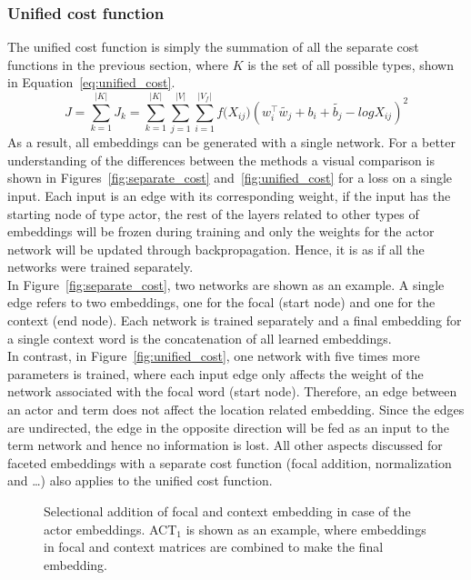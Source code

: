 \subsubsection{Unified cost function  }
\label{sec:unified_cost}
The unified cost function is simply the summation of all the separate cost functions in the previous section, where $K$ is the set of all possible types, shown in Equation~\ref{eq:unified_cost}.
\begin{equation}
J=\sum _{ k=1 }^{ |K| }{J_k}=\sum _{ k=1 }^{ |K| }{}\sum _{ j=1 }^{ |V| }{}\sum _{ i=1 }^{ |V_f| }{ f({ X }_{ ij } } )(w_{ i }^{ \top }\tilde{  w_{ j } } +b_{ i }+\tilde{  b_{ j } } -log{ X }_{ ij })^2
\label{eq:unified_cost}
\end{equation}
As a result, all embeddings can be generated with a single network. For a better understanding of the differences between the methods a visual comparison is shown in Figures~\ref{fig:separate_cost} and~\ref{fig:unified_cost} for a loss on a single input. Each input is an edge with its corresponding weight, if the input has the starting node of type actor, the rest of the layers related to other types of embeddings will be frozen during training and only the weights for the actor network will be updated through backpropagation. Hence, it is as if all the networks were trained separately.  \\
In Figure~\ref{fig:separate_cost}, two networks are shown as an example. A single edge refers to two embeddings, one for the focal (start node) and one for the context (end node). Each network is trained separately and a final embedding for a single context word is the concatenation of all learned embeddings. \\
In contrast, in Figure~\ref{fig:unified_cost}, one network with five times more parameters is trained, where each input edge only affects the weight of the network associated with the focal word (start node). Therefore, an edge between an actor and term does not affect the location related embedding. Since the edges are undirected, the edge in the opposite direction will be fed as an input to the term network and hence no information is lost. All other aspects discussed for faceted embeddings with a separate cost function (focal addition, normalization and \dots) also applies to the unified cost function.
\begin{figure}
{\small 
{} %

}
\caption{Selectional addition of focal and context embedding in case of the actor embeddings. ACT$_1$ is shown as an example, where embeddings in focal and context matrices are combined to make the final embedding.} \label{fig:focal_addition}
\end{figure}

